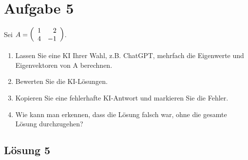 \documentclass[main.tex]{subfiles}
\begin{document}
\section{Aufgabe 5}
Sei $A = \eqmatrix{rr}{1 & 2 \\ 4 & -1}$.
\begin{enumerate}
    \item Lassen Sie eine KI Ihrer Wahl, z.B. ChatGPT, mehrfach die Eigenwerte und Eigenvektoren von A berechnen.
    \item Bewerten Sie die KI-Lösungen.
    \item Kopieren Sie eine fehlerhafte KI-Antwort und markieren Sie die Fehler. 
    \item Wie kann man erkennen, dass die Lösung falsch war, ohne die gesamte Lösung durchzugehen?
\end{enumerate}

\subsection{Lösung 5}
\end{document}
